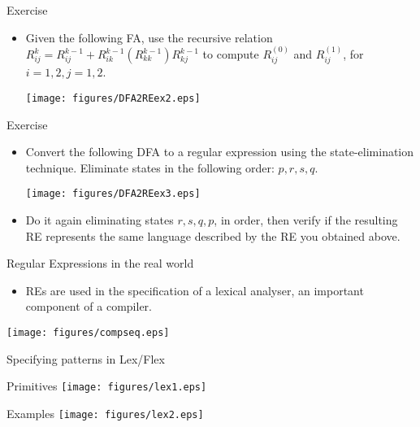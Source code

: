 \documentclass{prosper}%
\begin{document}
\begin{slide}{Exercise}
\begin{itemize}
\item Given the following FA, use the recursive relation $R^k_{ij}=R^{k-1}_{ij}+R^{k-1}_{ik}(R^{k-1}_{kk})R^{k-1}_{kj}$ to compute $R_{ij}^{(0)}$ and $R_{ij}^{(1)}$, for $i=1,2, j=1,2$.

\begin{center}
\texttt{[image: figures/DFA2REex2.eps]}
\end{center}

\end{itemize}
\end{slide}

\begin{slide}{Exercise}
\begin{itemize}
\item Convert the following DFA to a regular expression using the state-elimination technique. Eliminate states in the following order: $p, r, s, q$.

\begin{center}
\texttt{[image: figures/DFA2REex3.eps]}
\end{center}
\item Do it again eliminating states $r,s,q,p$, in order, then verify if the resulting RE represents the same language described by the RE you obtained above.
\end{itemize}
\end{slide}

\begin{slide}{Regular Expressions in the real world}
\begin{minipage}{4cm}
\begin{itemize}
\item REs are used in the specification of a {\blue lexical analyser}, an important component of a compiler.
\end{itemize}
\end{minipage}
\begin{minipage}{3cm}
\begin{center}
\texttt{[image: figures/compseq.eps]}
\end{center}
\end{minipage}
\end{slide}

\begin{slide}{Specifying patterns in Lex/Flex}
\begin{minipage}{6cm}
\begin{center}
Primitives
\texttt{[image: figures/lex1.eps]}
\end{center}
\end{minipage}
\begin{minipage}{4cm}
\begin{center}
Examples
\texttt{[image: figures/lex2.eps]}
\end{center}
\end{minipage}
\end{slide}
\end{document}
